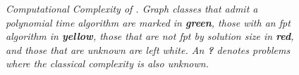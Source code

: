 \begin{center}
\begin{table}[ht]
{\begin{tabularx}{1.5\textwidth}{lllllll}
        
        \midrule
        \bottomrule
    \end{tabularx}
}
    \end{table}
\end{center}


\begin{figure}
    \centering
    \resizebox{1.0\textwidth}{!}{
        
    }
    \caption[Graph inclusions]{\textit{Computational Complexity of \sdom. Graph classes that admit a polynomial time algorithm are marked in \textbf{\textcolor{MATHAGREEN}{green}}, those with an fpt algorithm in \textbf{\textcolor{MATHAYELLOW}{yellow}}, those that are not fpt by solution size in \textbf{\textcolor{MATHARED}{red}}, and those that are unknown are left \textit{white}.
    An \textbf{?} denotes problems where the classical complexity is also unknown.}}
    
    \label{fig:bigpicture}
\end{figure}